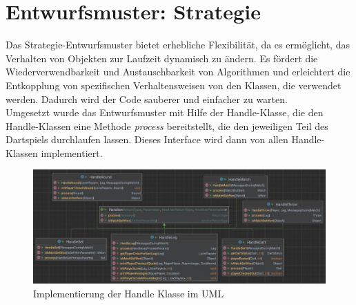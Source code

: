 \section{Entwurfsmuster: Strategie}
Das Strategie-Entwurfsmuster bietet erhebliche Flexibilität, da es ermöglicht, das Verhalten von Objekten zur Laufzeit dynamisch zu ändern. Es fördert die Wiederverwendbarkeit und Austauschbarkeit von Algorithmen und erleichtert die Entkopplung von spezifischen Verhaltensweisen von den Klassen, die verwendet werden. Dadurch wird der Code sauberer und einfacher zu warten.\\

Umgesetzt wurde das Entwurfsmuster mit Hilfe der Handle-Klasse, die den Handle-Klassen eine Methode \textit{process} bereitstellt, die den jeweiligen Teil des Dartspiels durchlaufen lassen. Dieses Interface wird dann von allen Handle-Klassen implementiert.\\
\begin{figure}[ht]
    \centering
    \includegraphics[width=1\textwidth]{Bilder/handleuml.png}
    \caption{Implementierung der Handle Klasse im UML}
    \label{fig:handleuml}
\end{figure}